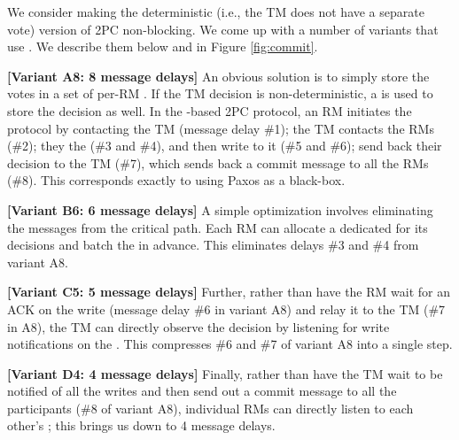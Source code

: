 We consider making the deterministic (i.e., the TM does not have a separate vote) version of 2PC non-blocking. We come up with a number of variants that use \WORs{}. We describe them below and in Figure \ref{fig:commit}.

\textbf{[Variant A8: 8 message delays]} An obvious solution is to simply store the votes in a set of per-RM \WORs{}. If the TM decision is non-deterministic, a \WOR{} is used to store the decision as well. In the \WOR{}-based 2PC protocol, an RM initiates the protocol by contacting the TM (message delay \#1); the TM contacts the RMs (\#2); they \prepare{} the \WOR{} (\#3 and \#4), and then write to it (\#5 and \#6); send back their decision to the TM (\#7), which sends back a commit message to all the RMs (\#8). This corresponds exactly to using Paxos as a black-box.%


\textbf{[Variant B6: 6 message delays]} A simple optimization involves eliminating the \prepare{} messages from the critical path. Each RM can allocate a dedicated \WOS{} for its decisions and batch \prepare{} the \WOS{} in advance. This eliminates delays \#3 and \#4 from variant A8.%


\textbf{[Variant C5: 5 message delays]} Further, rather than have the RM wait for an ACK on the write (message delay \#6 in variant A8) and relay it to the TM (\#7 in A8), the TM can directly observe the decision by listening for write notifications on the \WOS{}. This compresses \#6 and \#7 of variant A8 into a single step.%


\textbf{[Variant D4: 4 message delays]} Finally, rather than have the TM wait to be notified of all the \WOR{} writes and then send out a commit message to all the participants (\#8 of variant A8), individual RMs can directly listen to each other's \WOSes{}; this brings us down to 4 message delays.



